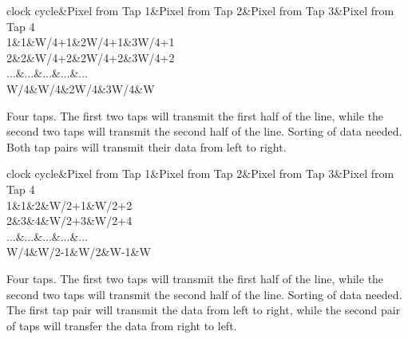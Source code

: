 \begin{Desc}
\begin{description}
\begin{TabularC}{5}
\hline
clock cycle&Pixel from Tap 1&Pixel from Tap 2&Pixel from Tap 3&Pixel from Tap 4 \\
1&1&W/4+1&2\+W/4+1&3\+W/4+1 \\
2&2&W/4+2&2\+W/4+2&3\+W/4+2 \\
...&...&...&...&... \\
W/4&W/4&2\+W/4&3\+W/4&W \\
\end{TabularC}
\item[{\em 
\hypertarget{group___device_specific_interface_gga25ba65893f1ee0e7de99cb51bb858d99a964dcedfe21332dcd847fb054432b9a1}{cltxg2\+X2}\label{group___device_specific_interface_gga25ba65893f1ee0e7de99cb51bb858d99a964dcedfe21332dcd847fb054432b9a1}
}]Four taps. The first two taps will transmit the first half of the line, while the second two taps will transmit the second half of the line. Sorting of data needed. Both tap pairs will transmit their data from left to right.

\begin{TabularC}{5}
\hline
clock cycle&Pixel from Tap 1&Pixel from Tap 2&Pixel from Tap 3&Pixel from Tap 4 \\
1&1&2&W/2+1&W/2+2 \\
2&3&4&W/2+3&W/2+4 \\
...&...&...&...&... \\
W/4&W/2-\/1&W/2&W-\/1&W \\
\end{TabularC}
\item[{\em 
\hypertarget{group___device_specific_interface_gga25ba65893f1ee0e7de99cb51bb858d99a3c1f886e3b6a4d65705200351a217939}{cltxg2\+X2\+E}\label{group___device_specific_interface_gga25ba65893f1ee0e7de99cb51bb858d99a3c1f886e3b6a4d65705200351a217939}
}]Four taps. The first two taps will transmit the first half of the line, while the second two taps will transmit the second half of the line. Sorting of data needed. The first tap pair will transmit the data from left to right, while the second pair of taps will transfer the data from right to left.


\end{description}
\end{Desc}
